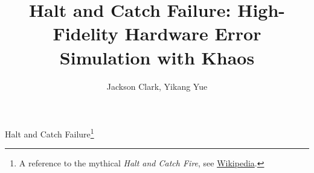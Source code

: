 \documentclass[sigplan,screen,10pt]{acmart}
\begin{document}
\title{Halt and Catch Failure: High-Fidelity Hardware Error Simulation with Khaos}

\author{Jackson Clark, Yikang Yue}



\maketitle
Halt and Catch Failure\footnote{A reference to the mythical \emph{Halt and Catch Fire}, see \href{https://en.wikipedia.org/wiki/Halt_and_Catch_Fire_(computing)}{Wikipedia}.}









\end{document}
